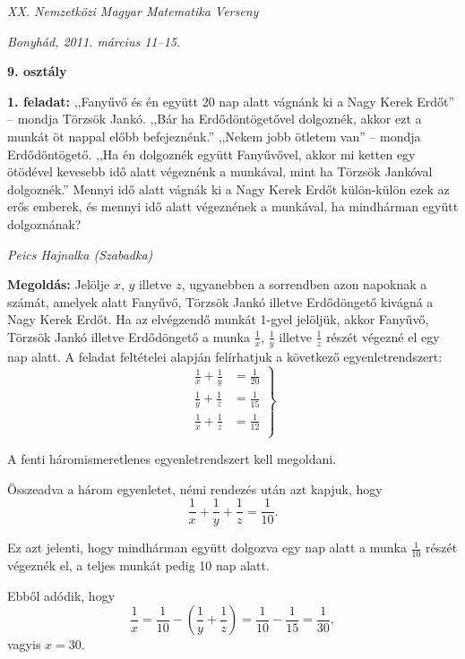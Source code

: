 \documentclass[a4paper,10pt]{article}
\newcommand{\ki}[2]{\hfill {\it #1 (#2)}\medskip}
\begin{document}
\begin{center} \Large {\em XX. Nemzetközi Magyar Matematika Verseny} \end{center}
\begin{center} \large{\em Bonyhád, 2011. március 11--15.} \end{center}
\smallskip
\begin{center} \large{\bf 9. osztály} \end{center}
\bigskip 

{\bf 1. feladat: } ,,Fanyűvő és én együtt 20 nap alatt vágnánk ki a Nagy Kerek Erdőt'' -- mondja Törzsök Jankó. ,,Bár ha Erdődöntögetővel dolgoznék, akkor ezt a munkát öt nappal előbb befejeznénk.'' ,,Nekem jobb ötletem van'' -- mondja Erdődöntögető. ,,Ha én dolgoznék együtt Fanyűvővel, akkor mi ketten egy ötödével kevesebb idő alatt végeznénk a munkával, mint ha Törzsök Jankóval dolgoznék.'' Mennyi idő alatt vágnák ki a Nagy Kerek Erdőt külön-külön ezek az erős emberek, és mennyi idő alatt végeznének a munkával, ha mindhárman együtt dolgoznának?

\ki{Peics Hajnalka}{Szabadka}\medskip


{\bf Megoldás: } Jelölje $x$, $y$ illetve $z$, ugyanebben a sorrendben azon napoknak a számát, amelyek alatt Fanyűvő, Törzsök Jankó illetve Erdődöngető kivágná a Nagy Kerek Erdőt. Ha az elvégzendő munkát 1-gyel jelöljük, akkor Fanyűvő, Törzsök Jankó illetve Erdődöngető a munka $\frac1x$, $\frac1y$ illetve $\frac1z$ részét végezné el egy nap alatt. A feladat feltételei alapján felírhatjuk a következő e\-gyen\-let\-rend\-szert:
\begin{equation*}
\left.
\begin{aligned}
\frac1x+\frac1y&=\frac{1}{20} \\
\frac1y+\frac1z&=\frac{1}{15} \\
\frac1x+\frac1z&=\frac{1}{12} \\
\end{aligned}
\right\}
\end{equation*}

A fenti háromismeretlenes egyenletrendszert kell megoldani.

Összeadva a három egyenletet, némi rendezés után azt kapjuk, hogy
\[\frac1x+\frac1y+\frac1z=\frac{1}{10}.\]

Ez azt jelenti, hogy mindhárman együtt dolgozva egy nap alatt a munka $\frac{1}{10}$ részét végeznék el, a teljes munkát pedig 10 nap alatt.

Ebből adódik, hogy
\[\frac1x=\frac{1}{10}-\left(\frac1y+\frac1z\right)=\frac{1}{10}-\frac{1}{15}=\frac{1}{30},\]
vagyis $x=30$.
\end{document}
